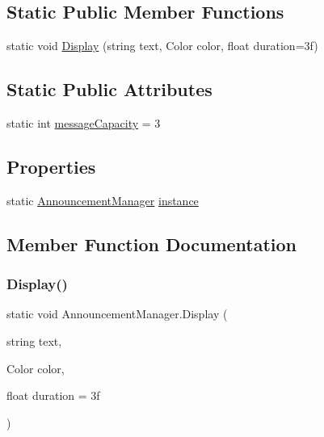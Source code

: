\subsection*{Static Public Member Functions}
\begin{DoxyCompactItemize}
\item 
static void \mbox{\hyperlink{class_announcement_manager_a931bdfbc829e1165fdbd7a3a848e95d1}{Display}} (string text, Color color, float duration=3f)
\end{DoxyCompactItemize}
\subsection*{Static Public Attributes}
\begin{DoxyCompactItemize}
\item 
static int \mbox{\hyperlink{class_announcement_manager_aa23d155cc088be3437ef92cc337c0492}{message\+Capacity}} = 3
\end{DoxyCompactItemize}
\subsection*{Properties}
\begin{DoxyCompactItemize}
\item 
static \mbox{\hyperlink{class_announcement_manager}{Announcement\+Manager}} \mbox{\hyperlink{class_announcement_manager_a23f0a77f19174bf82815db8a2c3f4c94}{instance}}
\end{DoxyCompactItemize}


\subsection{Member Function Documentation}
\mbox{\label{class_announcement_manager_a931bdfbc829e1165fdbd7a3a848e95d1}} 
\subsubsection{\texorpdfstring{Display()}{Display()}}
{\footnotesize\ttfamily static void Announcement\+Manager.\+Display (\begin{DoxyParamCaption}\item[{string}]{text,  }\item[{Color}]{color,  }\item[{float}]{duration = {\ttfamily 3f} }\end{DoxyParamCaption})\hspace{0.3cm}{\ttfamily [static]}}

